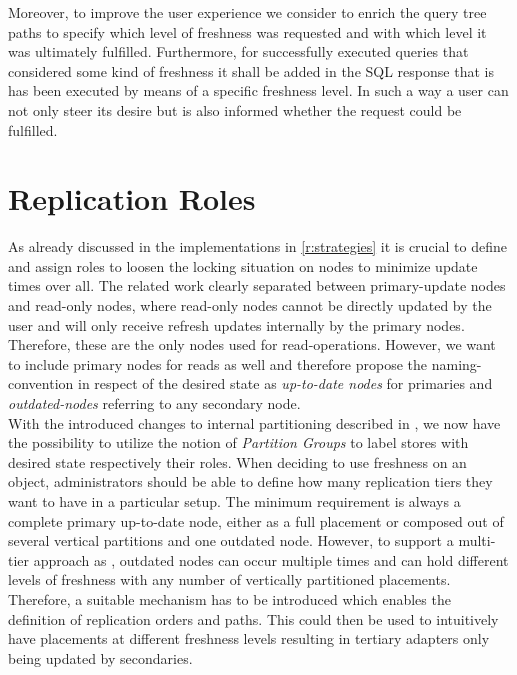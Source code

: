 Moreover, to improve the user experience we consider to enrich the query tree paths to specify which level of freshness was requested and with which level it was 
ultimately fulfilled. Furthermore, for successfully executed queries that considered some kind of freshness it shall be added in the SQL response that is has been 
executed by means of a specific freshness level.
In such a way a user can not only steer its desire but is also informed whether the request could be fulfilled.




\section{ Replication Roles }
\label{roles}

As already discussed in the implementations in \ref{r:strategies} it is crucial to define and assign roles to loosen the locking situation on nodes
to minimize update times over all. The related work clearly separated between primary-update nodes and read-only nodes, where 
read-only nodes cannot be directly updated by the user and will only receive refresh updates internally by the primary nodes.
Therefore, these are the only nodes used for read-operations. 
However, we want to include primary nodes for reads as well and therefore propose the naming-convention in respect of the desired state as \emph{up-to-date nodes} for primaries
and \emph{outdated-nodes} referring to any secondary node. \\
With the introduced changes to internal partitioning described in \cite{hennemann_2021}, we now have the possibility to utilize the notion of \emph{Partition Groups}
to label stores with desired state respectively their roles.  
When deciding to use freshness on an object, administrators should be able to define how many replication tiers they want to have in a particular setup.
The minimum requirement is always a complete primary up-to-date node, either as a full placement or composed out of several vertical partitions and one outdated node.  
However, to support a multi-tier approach as \cite{voicu:2010}, outdated nodes can occur multiple times and can hold different levels of freshness with any number of vertically partitioned
placements. Therefore, a suitable mechanism has to be introduced which enables the definition of replication orders and paths. This could then be used to 
intuitively have placements at different freshness levels resulting in tertiary adapters only being updated by secondaries.\\







